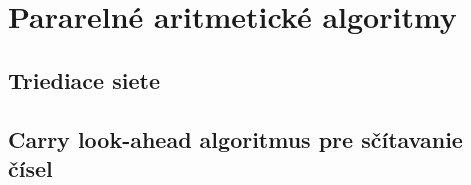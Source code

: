 \documentclass[../main.tex]{subfiles}
\begin{document}
\section{Pararelné aritmetické algoritmy}
\subsection{Triediace siete}
\subsection{Carry look-ahead algoritmus pre sčítavanie čísel}
\end{document}
